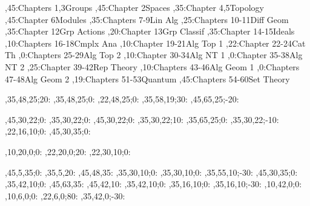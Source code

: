 
\setcounter{diagheight}{50}
\begin{chart}
,45:{Chapters 1,3}{Groups}{}
,45:{Chapter 2}{Spaces}{}
,35:{Chapter 4,5}{Topology}{}
,45:{Chapter 6}{Modules}{}
,35:{Chapters 7-9}{Lin Alg}{}
,25:{Chapters 10-11}{Diff Geom}{}
,35:{Chapter 12}{Grp Actions}{}
,20:{Chapter 13}{Grp Classif}{}
,35:{Chapter 14-15}{Ideals}{}
,10:{Chapters 16-18}{Cmplx Ana}{}
,10:{Chapter 19-21}{Alg Top 1}{}
,22:{Chapter 22-24}{Cat Th}{}
,0:{Chapters 25-29}{Alg Top 2}{}
,10:{Chapter 30-34}{Alg NT 1}{}
,0:{Chapter 35-38}{Alg NT 2}{}
,25:{Chapter 39-42}{Rep Theory}{}
,10:{Chapters 43-46}{Alg Geom 1}{}
,0:{Chapters 47-48}{Alg Geom 2}{}
,19:{Chapters 51-53}{Quantum}{}
,45:{Chapters 54-60}{Set Theory}{}

,35,48,25;20:  %
,35,48,25;0:   %
,22,48,25;0:   %
,35,58,19;30:  %
,45,65,25;-20: %

,45,30,22;0:   %
,35,30,22;0:   %
,45,30,22;0:   %
,35,30,22;10:  %
,35,65,25;0:   %
,35,30,22;-10: %
,22,16,10;0:   %
,45,30,35;0:   %

,10,20,0;0:    %
,22,20,0;20:   %
,22,30,10;0:   %

,45,5,35;0:    %
,35,5,20:      %
,45,48,35:     %
,35,30,10;0:   %
,35,30,10;0:   %
,35,55,10;-30: %
,45,30,35;0:   %
,35,42,10;0:   %
,45,63,35:     %
,45,42,10:     %
,35,42,10;0:   %
,35,16,10;0:   %
,35,16,10;-30: %
,10,42,0;0:    %
,10,6,0;0:     %
,22,6,0;80:     %
,35,42,0;-30:  %
\end{chart}
